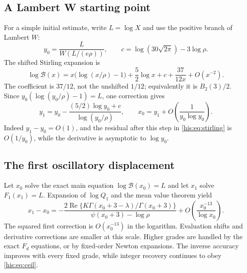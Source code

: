 \documentclass[11pt]{article}
\theoremstyle{remark}\newtheorem{remark}[theorem]{Remark}
\DeclareMathOperator{\Rea}{Re}
\newcommand{\la}{\lambda}
\numberwithin{equation}{section}
\begin{document}
\subsection{A Lambert W starting point}
For a simple initial estimate, write $L=\log X$ and use the positive branch of Lambert $W$:
\begin{equation}\label{his:eq:y0}
 y_0=\frac{L}{W(L/(e\rho))},\qquad
 c=\log(30\sqrt{2\pi})-3\log\rho.
\end{equation}
The shifted Stirling expansion is
\begin{equation}\label{his:eq:stirling}
 \log\mathcal B(x)=x\bigl(\log(x/\rho)-1\bigr)
 +\frac52\log x+c+\frac{37}{12x}+O(x^{-2}).
\end{equation}
The coefficient is $37/12$, not the unshifted $1/12$; equivalently it is $B_2(3)/2$. Since $y_0(\log(y_0/\rho)-1)=L$, one correction gives
\begin{equation}\label{his:eq:y1}
 y_1=y_0-\frac{(5/2)\log y_0+c}{\log(y_0/\rho)},\qquad
 x_0=y_1+O\!\left(\frac1{y_0\log y_0}\right).
\end{equation}
Indeed $y_1-y_0=O(1)$, and the residual after this step in \eqref{his:eq:stirling} is $O(1/y_0)$, while the derivative is asymptotic to $\log y_0$.

\subsection{The first oscillatory displacement}
Let $x_0$ solve the exact main equation $\log\mathcal B(x_0)=L$ and let $x_1$ solve $F_1(x_1)=L$. Expansion of $\log Q_1$ and the mean value theorem yield
\begin{equation}\label{his:eq:inverse-oscillation}
 x_1-x_0=
 -\frac{2\Rea\{K\Gamma(x_0+3-\la)/\Gamma(x_0+3)\}}
        {\psi(x_0+3)-\log\rho}
 +O\!\left(\frac{x_0^{-13}}{\log x_0}\right).
\end{equation}
The squared first correction is $O(x_0^{-13})$ in the logarithm. Evaluation shifts and derivative corrections are smaller at this scale. Higher grades are handled by the exact $F_d$ equations, or by fixed-order Newton expansions. The inverse accuracy improves with every fixed grade, while integer recovery continues to obey \eqref{his:eq:ceil}.
\end{document}
